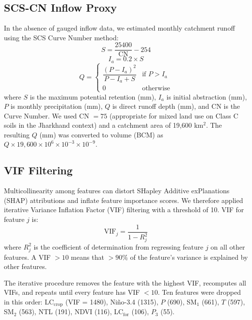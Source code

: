 \documentclass[12pt,a4paper,oneside]{report}
\begin{document}
\subsection{SCS-CN Inflow Proxy}

In the absence of gauged inflow data, we estimated monthly catchment
runoff using the SCS Curve Number method:
\begin{equation}
  S = \frac{25400}{\mathrm{CN}} - 254
  \label{eq:scs_s}
\end{equation}
\begin{equation}
  I_a = 0.2 \times S
  \label{eq:scs_ia}
\end{equation}
\begin{equation}
  Q = \begin{cases}
    \dfrac{(P - I_a)^2}{P - I_a + S} & \text{if } P > I_a \\[8pt]
    0 & \text{otherwise}
  \end{cases}
  \label{eq:scs_q}
\end{equation}
where $S$ is the maximum potential retention (mm), $I_a$ is initial
abstraction (mm), $P$ is monthly precipitation (mm), $Q$ is direct runoff
depth (mm), and CN is the Curve Number. We used CN $= 75$ (appropriate for
mixed land use on Class C soils in the Jharkhand context) and a catchment
area of 19,600 km$^2$. The resulting $Q$ (mm) was converted to volume (BCM)
as $Q \times 19{,}600 \times 10^6 \times 10^{-3} \times 10^{-9}$.

\subsection{VIF Filtering}
\label{sec:vif}

Multicollinearity among features can distort SHapley Additive exPlanations
(SHAP) attributions and inflate feature importance scores. We therefore
applied iterative Variance Inflation Factor (VIF) filtering with a threshold
of 10.
VIF for feature $j$ is:
\begin{equation}
  \mathrm{VIF}_j = \frac{1}{1 - R_j^2}
  \label{eq:vif}
\end{equation}
where $R_j^2$ is the coefficient of determination from regressing feature $j$
on all other features. A VIF $> 10$ means that $> 90$\% of the feature's
variance is explained by other features.

The iterative procedure removes the feature with the highest VIF, recomputes
all VIFs, and repeats until every feature has VIF $< 10$. Ten features were
dropped in this order: LC$_{\text{crop}}$ (VIF = 1480), Ni\~{n}o-3.4 (1315),
$P$ (690), SM$_1$ (661), $T$ (597), SM$_2$ (563), NTL (191), NDVI (116),
LC$_{\text{for}}$ (106), $P_3$ (55).
\end{document}
